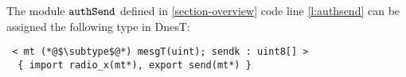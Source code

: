 \begin{exmp}
\label{example-nesttyping}
The module $\tt{authSend}$ defined in \autoref{section-overview} code line \ref{l:authsend} can
be assigned the following type in DnesT:
\end{exmp}
\vspace{-2mm}
\lstset{numbers=none, basicstyle=\ttfamily} 
\begin{lstlisting}
 < mt (*@$\subtype$@*) mesgT(uint); sendk : uint8[] >  
  { import radio_x(mt*), export send(mt*) }
\end{lstlisting}
